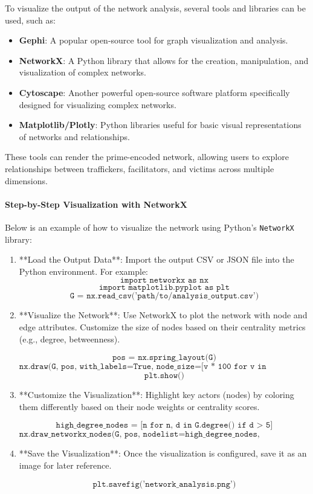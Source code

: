 \documentclass[%
 preprint, linenumbers,
 amsmath,amssymb,
 aps, physrev,
]{revtex4-2}
\begin{document}
To visualize the output of the network analysis, several tools and libraries can be used, such as:

\begin{itemize}
    \item \textbf{Gephi}: A popular open-source tool for graph visualization and analysis.
    \item \textbf{NetworkX}: A Python library that allows for the creation, manipulation, and visualization of complex networks.
    \item \textbf{Cytoscape}: Another powerful open-source software platform specifically designed for visualizing complex networks.
    \item \textbf{Matplotlib/Plotly}: Python libraries useful for basic visual representations of networks and relationships.
\end{itemize}

These tools can render the prime-encoded network, allowing users to explore relationships between traffickers, facilitators, and victims across multiple dimensions.

\paragraph{Step-by-Step Visualization with NetworkX}

Below is an example of how to visualize the network using Python's \texttt{NetworkX} library:

\begin{enumerate}
    \item **Load the Output Data**: Import the output CSV or JSON file into the Python environment. For example:
    \[
    \texttt{import networkx as nx}
    \]
    \[
    \texttt{import matplotlib.pyplot as plt}
    \]
    \[
    \texttt{G = nx.read\_csv('path/to/analysis\_output.csv')}
    \]
    
    \item **Visualize the Network**: Use NetworkX to plot the network with node and edge attributes. Customize the size of nodes based on their centrality metrics (e.g., degree, betweenness).
    
    \[
    \texttt{pos = nx.spring\_layout(G)}
    \]
    \[
    \texttt{nx.draw(G, pos, with\_labels=True, node\_size=[v * 100 for v in dict(nx.degree(G)).values()])}
    \]
    \[
    \texttt{plt.show()}
    \]
    
    \item **Customize the Visualization**: Highlight key actors (nodes) by coloring them differently based on their node weights or centrality scores.
    
    \[
    \texttt{high\_degree\_nodes = [n for n, d in G.degree() if d > 5]}
    \]
    \[
    \texttt{nx.draw\_networkx\_nodes(G, pos, nodelist=high\_degree\_nodes, node\_color='r', node\_size=300)}
    \]
    
    \item **Save the Visualization**: Once the visualization is configured, save it as an image for later reference.
    
    \[
    \texttt{plt.savefig('network\_analysis.png')}
    \]
\end{enumerate}
\end{document}
